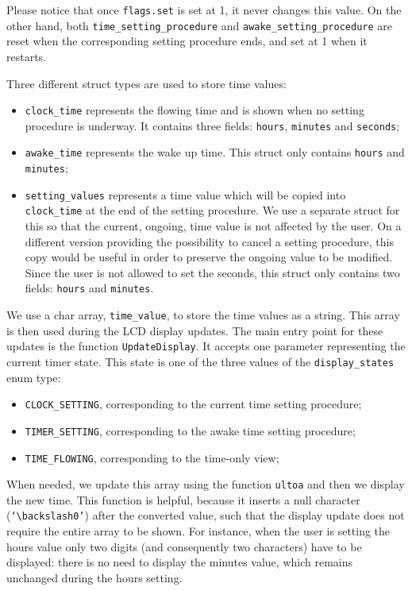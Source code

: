 Please notice that once \texttt{flags.set} is set at 1, it never changes this value. On the other hand, both \texttt{time\_setting\_procedure} and \texttt{awake\_setting\_procedure} are reset when the corresponding setting procedure ends, and set at 1 when it restarts.

Three different struct types are used to store time values:
\begin{itemize}
	\item \texttt{clock\_time} represents the flowing time and is shown when no setting procedure is underway. It contains three fields: \texttt{hours}, \texttt{minutes} and \texttt{seconds};
	\item \texttt{awake\_time} represents the wake up time. This struct only contains \texttt{hours} and \texttt{minutes};
	\item \texttt{setting\_values} represents a time value which will be copied into \\\texttt{clock\_time} at the end of the setting procedure. We use a separate struct for this so that the current, ongoing, time value is not affected by the user. On a different version providing the possibility to cancel a setting procedure, this copy would be useful in order to preserve the ongoing value to be modified. Since the user is not allowed to set the seconds, this struct only contains two fields: \texttt{hours} and \texttt{minutes}.
\end{itemize}

We use a char array, \texttt{time\_value}, to store the time values as a string. This array is then used during the LCD display updates. The main entry point for these updates is the function \texttt{UpdateDisplay}. It accepts one parameter representing the current timer state. This state is one of the three values of the \texttt{display\_states} enum type:
\begin{itemize}
	\item \texttt{CLOCK\_SETTING}, corresponding to the current time setting procedure;
	\item \texttt{TIMER\_SETTING}, corresponding to the awake time setting procedure;
	\item \texttt{TIME\_FLOWING}, corresponding to the time-only view;
\end{itemize}
When needed, we update this array using the function \texttt{ultoa} and then we display the new time. This function is helpful, because it inserts a null character (\texttt{`$\backslash$0'}) after the converted value, such that the display update does not require the entire array to be shown. For instance, when the user is setting the hours value only two digits (and consequently two characters) have to be displayed: there is no need to display the minutes value, which remains unchanged during the hours setting. 

